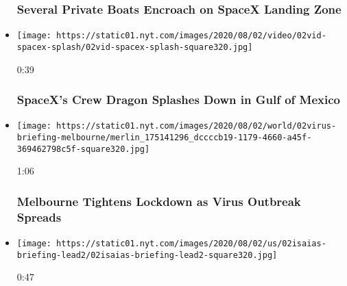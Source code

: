 \begin{itemize}
  \hypertarget{several-private-boats-encroach-on-spacex-landing-zone}{%
  \subsubsection{Several Private Boats Encroach on SpaceX Landing
  Zone}\label{several-private-boats-encroach-on-spacex-landing-zone}}
\item
  \href{https://www.nytimes.com/video/us/100000007269118/spacex-splash-down.html?action=click\&module=video-series-bar\&region=header\&pgtype=Article\&playlistId=video/latest-video}{}

  \texttt{[image: https://static01.nyt.com/images/2020/08/02/video/02vid-spacex-splash/02vid-spacex-splash-square320.jpg]}

  0:39

  \hypertarget{spacexs-crew-dragon-splashes-down-in-gulf-of-mexico}{%
  \subsubsection{SpaceX's Crew Dragon Splashes Down in Gulf of
  Mexico}\label{spacexs-crew-dragon-splashes-down-in-gulf-of-mexico}}
\item
  \href{https://www.nytimes.com/video/world/australia/100000007269116/coronavirus-restrictions-melbourne.html?action=click\&module=video-series-bar\&region=header\&pgtype=Article\&playlistId=video/latest-video}{}

  \texttt{[image: https://static01.nyt.com/images/2020/08/02/world/02virus-briefing-melbourne/merlin\_175141296\_dccccb19-1179-4660-a45f-369462798c5f-square320.jpg]}

  1:06

  \hypertarget{melbourne-tightens-lockdown-as-virus-outbreak-spreads}{%
  \subsubsection{Melbourne Tightens Lockdown as Virus Outbreak
  Spreads}\label{melbourne-tightens-lockdown-as-virus-outbreak-spreads}}
\item
  \href{https://www.nytimes.com/video/us/100000007268938/isaias-florida.html?action=click\&module=video-series-bar\&region=header\&pgtype=Article\&playlistId=video/latest-video}{}

  \texttt{[image: https://static01.nyt.com/images/2020/08/02/us/02isaias-briefing-lead2/02isaias-briefing-lead2-square320.jpg]}

  0:47


\end{itemize}
